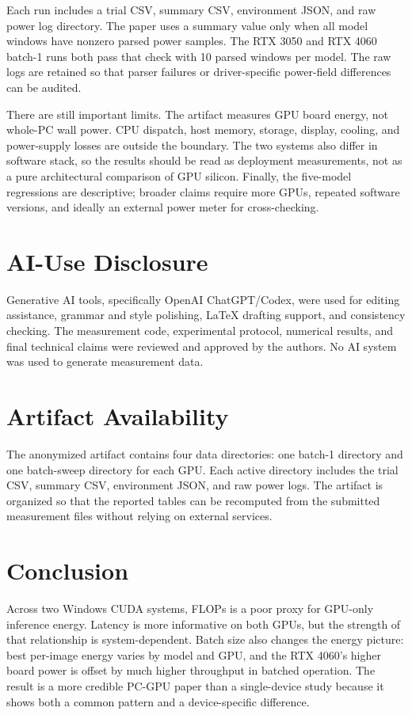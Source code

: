 \documentclass[conference]{IEEEtran}
\begin{document}
Each run includes a trial CSV, summary CSV, environment JSON, and raw power log
directory. The paper uses a summary value only when all model windows have
nonzero parsed power samples. The RTX 3050 and RTX 4060 batch-1 runs both pass
that check with 10 parsed windows per model. The raw logs are retained so that
parser failures or driver-specific power-field differences can be audited.

There are still important limits. The artifact measures GPU board energy, not
whole-PC wall power. CPU dispatch, host memory, storage, display, cooling, and
power-supply losses are outside the boundary. The two systems also differ in
software stack, so the results should be read as deployment measurements, not
as a pure architectural comparison of GPU silicon. Finally, the five-model
regressions are descriptive; broader claims require more GPUs, repeated
software versions, and ideally an external power meter for cross-checking.

\section{AI-Use Disclosure}

Generative AI tools, specifically OpenAI ChatGPT/Codex, were used for editing
assistance, grammar and style polishing, LaTeX drafting support, and consistency
checking. The measurement code, experimental protocol, numerical results, and
final technical claims were reviewed and approved by the authors. No AI system
was used to generate measurement data.

\section{Artifact Availability}

The anonymized artifact contains four data directories: one batch-1 directory
and one batch-sweep directory for each GPU. Each active directory includes the
trial CSV, summary CSV, environment JSON, and raw power logs. The artifact is
organized so that the reported tables can be recomputed from the submitted
measurement files without relying on external services.

\section{Conclusion}

Across two Windows CUDA systems, FLOPs is a poor proxy for GPU-only inference
energy. Latency is more informative on both GPUs, but the strength of that
relationship is system-dependent. Batch size also changes the energy picture:
best per-image energy varies by model and GPU, and the RTX 4060's higher board
power is offset by much higher throughput in batched operation. The result is a
more credible PC-GPU paper than a single-device study because it shows both a
common pattern and a device-specific difference.
\end{document}
